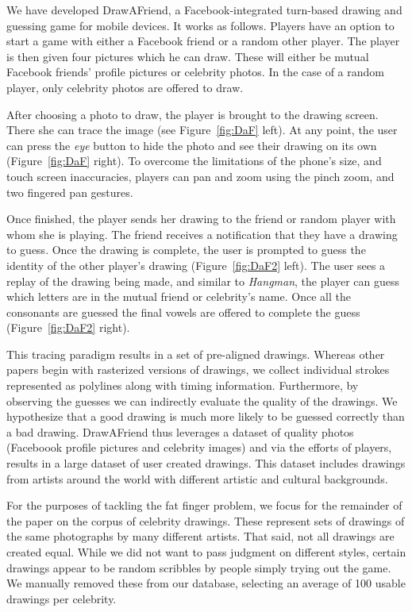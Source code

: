 We have developed DrawAFriend, a Facebook-integrated turn-based drawing and guessing game for mobile devices.  It works as follows. Players have an option to start a game with either a Facebook friend or a random other player.  The player is then given four pictures which he can draw. These will either be mutual Facebook friends' profile pictures or  celebrity photos. In the case of a random player, only celebrity photos are offered to draw.

After choosing a photo to draw, the player is brought to the drawing screen. There she can trace the image (see Figure~\ref{fig:DaF} left). At any point, the user can press the {\em eye} button to hide the photo and see their drawing on its own (Figure~\ref{fig:DaF} right). To overcome the limitations of the phone's size, and touch screen inaccuracies, players can pan and zoom using the pinch zoom, and two fingered pan gestures.

Once finished, the player sends her drawing to the friend or random player with whom she is playing. The friend receives a notification that they have a drawing to guess. Once the drawing is complete, the user is prompted to guess the identity of the other player's drawing (Figure~\ref{fig:DaF2} left). The user sees a replay of the drawing being made, and similar to {\em Hangman}, the player can guess which letters are in the mutual friend or celebrity's name. Once all the consonants are guessed the final vowels are offered to complete the guess (Figure~\ref{fig:DaF2} right).

This tracing paradigm results in a set of pre-aligned drawings. Whereas other papers begin with rasterized versions of drawings, we collect individual strokes represented as polylines along with timing information.  Furthermore, by observing the guesses we can indirectly evaluate the quality of the drawings. We hypothesize that a good drawing is much more likely to be guessed correctly than a bad drawing. DrawAFriend thus leverages a dataset of quality photos (Faceboook profile pictures and celebrity images) and via the efforts of players, results in a large dataset of user created drawings. This dataset includes drawings from artists around the world with different artistic and cultural backgrounds.

For the purposes of tackling the fat finger problem, we focus for the remainder of the paper on the corpus of celebrity drawings. These represent sets of drawings of the same photographs by many different artists. That said, not all drawings are created equal. While we did not want to pass judgment on different styles, certain drawings appear to be random scribbles by people simply trying out the game. We manually removed these from our database, selecting an average of 100 usable drawings per celebrity.

